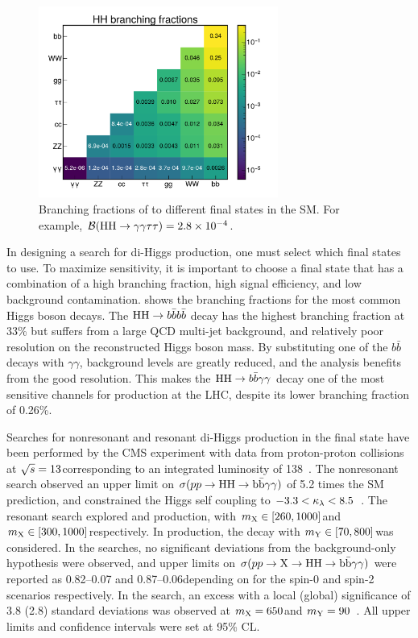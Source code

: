 \begin{figure}
  \centering
  \includegraphics[width=0.7\textwidth]{Figures/Dihiggs/introduction/dihiggs_br.pdf}
  \caption[SM Di-Higgs Branching Fractions]{Branching fractions of \HH to different final states in the SM. For example, $\mathcal{B}(\mathrm{H}\mathrm{H} \to \gamma\gamma\tau\tau) = 2.8\times10^{-4}$.}\label{fig:dihiggs_br}
\end{figure}

In designing a search for di-Higgs production, one must select which final states to use. To maximize sensitivity, it is important to choose a final state that has a combination of a high branching fraction, high signal efficiency, and low background contamination.  shows the \HH branching fractions for the most common Higgs boson decays. The $\mathrm{H}\mathrm{H} \to b\bar{b}b\bar{b}$ decay has the highest branching fraction at 33\% but suffers from a large QCD multi-jet background, and relatively poor resolution on the reconstructed Higgs boson mass. By substituting one of the $b\bar{b}$ decays with $\gamma\gamma$, background levels are greatly reduced, and the analysis benefits from the good \mgg resolution. This makes the $\mathrm{H}\mathrm{H} \to b\bar{b}\gamma\gamma$ decay one of the most sensitive channels for \HH production at the LHC, despite its lower branching fraction of 0.26\%.

Searches for nonresonant and resonant di-Higgs production in the \bbgg final state have been performed by the CMS experiment with data from proton-proton collisions at $\sqrt{s}=13$\TeV corresponding to an integrated luminosity of 138\fbinv~\cite{CMS:2020tkr,CMS:2023boe}. The nonresonant search observed an upper limit on $\sigma(pp \to \mathrm{H}\mathrm{H} \to \mathrm{b}\bar{\mathrm{b}}\gamma\gamma)$ of 5.2 times the SM prediction, and constrained the Higgs self coupling to $-3.3 < \kappa_\lambda < 8.5$~\cite{CMS:2020tkr}. The resonant search explored \XHH and \XYH production, with $m_{\mathrm{X}} \in [260, 1000]$\GeV and $m_{\mathrm{X}} \in [300, 1000]$\GeV respectively. In \XYH production, the \Ybb decay with $m_{\mathrm{Y}} \in [70, 800]$\GeV was considered. In the \XHH searches, no significant deviations from the background-only hypothesis were observed, and upper limits on $\sigma(pp \to \mathrm{X} \to \mathrm{H}\mathrm{H} \to \mathrm{b}\bar{\mathrm{b}}\gamma\gamma)$ were reported as 0.82--0.07 and 0.87--0.06\fb depending on \mX for the spin-0 and spin-2 scenarios respectively. In the \XYH search, an excess with a local (global) significance of 3.8 (2.8) standard deviations was observed at $m_{\mathrm{X}}=650$\GeV and $m_{\mathrm{Y}}=90$\GeV~\cite{CMS:2023boe}. All upper limits and confidence intervals were set at 95\% CL.

